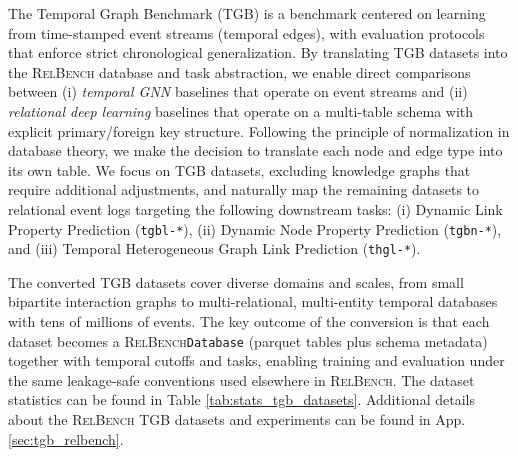 \documentclass{article} %
\newcommand{\relbench}{\textsc{RelBench}\xspace}
\begin{document}
The Temporal Graph Benchmark (TGB) is a benchmark centered on learning from time-stamped event streams (temporal edges), with evaluation protocols that enforce strict chronological generalization. By translating TGB datasets into the \relbench database and task abstraction, we enable direct comparisons between (i) \emph{temporal GNN} baselines that operate on event streams and (ii) \emph{relational deep learning} baselines that operate on a multi-table schema with explicit primary/foreign key structure. Following the principle of normalization in database theory, we make the decision to translate each node and edge type into its own table. We focus on TGB datasets, excluding knowledge graphs that require additional adjustments, and naturally map the remaining datasets to relational event logs targeting the following downstream tasks:
(i) Dynamic Link Property Prediction (\texttt{tgbl-*}),
(ii) Dynamic Node Property Prediction (\texttt{tgbn-*}), and
(iii) Temporal Heterogeneous Graph Link Prediction (\texttt{thgl-*}).



The converted TGB datasets cover diverse domains and scales, from small bipartite interaction graphs to multi-relational, multi-entity temporal databases with tens of millions of events. The key outcome of the conversion is that each dataset becomes a \relbench \texttt{Database} (parquet tables plus schema metadata) together with temporal cutoffs and tasks, enabling training and evaluation under the same leakage-safe conventions used elsewhere in \relbench. The dataset statistics can be found in Table \ref{tab:stats_tgb_datasets}. Additional details about the \relbench TGB datasets and experiments can be found in App. \ref{sec:tgb_relbench}. 

\end{document}
